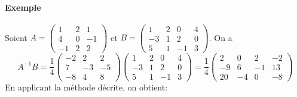 \paragraph{Exemple} Soient $A = \begin{pmatrix} 1 & 2 & 1 \\ 4 & 0 & -1 \\ -1 & 2 & 2 \end{pmatrix}$ et $B = \begin{pmatrix} 1 & 2 & 0 & 4 \\ -3 & 1 & 2 & 0 \\ 5 & 1 & -1 & 3 \end{pmatrix}$.
On a
$$A^{-1} B 
  = \frac{1}{4} \begin{pmatrix} -2 & 2 & 2 \\ 7 & -3 & -5 \\ -8 & 4 & 8 \end{pmatrix} 
    \begin{pmatrix} 1 & 2 & 0 & 4 \\ -3 & 1 & 2 & 0 \\ 5 & 1 & -1 & 3 \end{pmatrix} 
  = \frac{1}{4} \begin{pmatrix} 2 & 0 & 2 & -2 \\ -9 & 6 & -1 & 13 \\ 20 & -4 & 0 & -8 \end{pmatrix}$$
En applicant la méthode décrite, on obtient:
